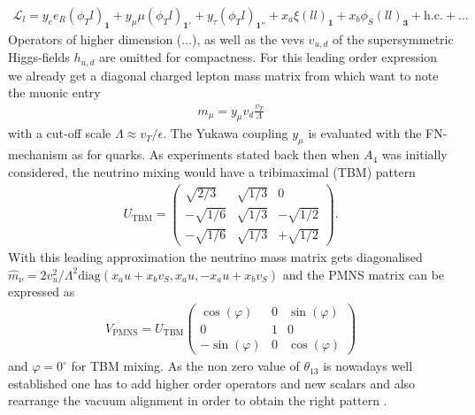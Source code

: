 \begin{align}
 \mathcal{L}_l = y_e e_R(\phi_T l)_{\textbf{1}} + y_\mu \mu (\phi_T l)_{\textbf{1}'} + y_\tau (\phi_Tl)_{\textbf{1}''} + x_a\xi(ll)_{\textbf{1}} + x_b \phi_S (ll)_{\textbf{3}} + \text{h.c.}+...
\end{align}
Operators of higher dimension (...), as well as the vevs $v_{u,d}$ of the supersymmetric Higgs-fields $h_{u,d}$ are omitted for compactness. 
For this leading order expression we already get a diagonal charged lepton mass matrix from which want to note the muonic entry
\begin{align}
 m_\mu = y_\mu v_d \frac{v_T}{\Lambda}
 \label{eq_muonmass}
\end{align}
with a cut-off scale $\Lambda\approx v_T/\epsilon$. The Yukawa coupling $y_\mu$ is evaluated with the FN-mechanism as for quarks. As experiments
stated back then when $A_4$ was initially considered, the neutrino mixing would have a tribimaximal (TBM) pattern 
\begin{align}
 U_\text{TBM} = \begin{pmatrix}
                 \sqrt{2/3}&\sqrt{1/3}&0\\
                 -\sqrt{1/6}&\sqrt{1/3}&-\sqrt{1/2}\\
                 -\sqrt{1/6}&\sqrt{1/3}&+\sqrt{1/2}
                \end{pmatrix}.
\end{align}
With this leading approximation the neutrino mass matrix gets diagonalised $\hat{m}_\nu=2v_u^2/\Lambda^2 \text{diag}(x_au+x_bv_S,x_au,-x_au+x_bv_S)$
and the PMNS matrix can be expressed as \cite{1211.5370}
\begin{align}
 V_\text{PMNS} = U_\text{TBM}\begin{pmatrix}
                              \cos(\varphi) & 0 &\sin(\varphi)\\
                              0&1&0\\
                              -\sin(\varphi) & 0 & \cos(\varphi)
                             \end{pmatrix}
\end{align}
and $\varphi = 0^\circ$ for TBM mixing.
As the non zero value of $\theta_{13}$ is nowadays well established \cite{1303.1289} one has to add higher order operators and new scalars and
also rearrange the vacuum alignment in order to obtain the right pattern \cite{1211.5370}\cite{Tprime}. 



